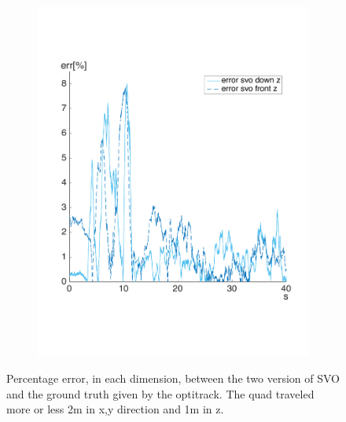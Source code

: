 \begin{figure}[!htbp]
\begin{subfigure}[b]{0.3\textwidth}
        \includegraphics[width=\textwidth]{img/err_perc_2_svo_z.pdf}
        \label{fig:perc_errorthree}
   \end{subfigure}
  \caption{Percentage error, in each dimension, between the two version of SVO and the ground truth given by the optitrack. The quad traveled more or less 2m in x,y direction and 1m in z.}
  \label{fig:perc_error}
\end{figure} 

